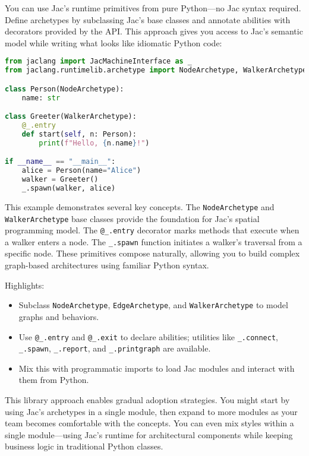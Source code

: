 You can use Jac's runtime primitives from pure Python—no Jac syntax required. Define archetypes by subclassing Jac's base classes and annotate abilities with decorators provided by the API. This approach gives you access to Jac's semantic model while writing what looks like idiomatic Python code:

\begin{lstlisting}[language=Python]
from jaclang import JacMachineInterface as _
from jaclang.runtimelib.archetype import NodeArchetype, WalkerArchetype

class Person(NodeArchetype):
    name: str

class Greeter(WalkerArchetype):
    @_.entry
    def start(self, n: Person):
        print(f"Hello, {n.name}!")

if __name__ == "__main__":
    alice = Person(name="Alice")
    walker = Greeter()
    _.spawn(walker, alice)
\end{lstlisting}

This example demonstrates several key concepts. The \texttt{NodeArchetype} and \texttt{WalkerArchetype} base classes provide the foundation for Jac's spatial programming model. The \texttt{@\_.entry} decorator marks methods that execute when a walker enters a node. The \texttt{\_.spawn} function initiates a walker's traversal from a specific node. These primitives compose naturally, allowing you to build complex graph-based architectures using familiar Python syntax.

Highlights:
\begin{itemize}
    \item Subclass \texttt{NodeArchetype}, \texttt{EdgeArchetype}, and \texttt{WalkerArchetype} to model graphs and behaviors.
    \item Use \texttt{@\_.entry} and \texttt{@\_.exit} to declare abilities; utilities like \texttt{\_.connect}, \texttt{\_.spawn}, \texttt{\_.report}, and \texttt{\_.printgraph} are available.
    \item Mix this with programmatic imports to load Jac modules and interact with them from Python.
\end{itemize}

This library approach enables gradual adoption strategies. You might start by using Jac's archetypes in a single module, then expand to more modules as your team becomes comfortable with the concepts. You can even mix styles within a single module—using Jac's runtime for architectural components while keeping business logic in traditional Python classes.

